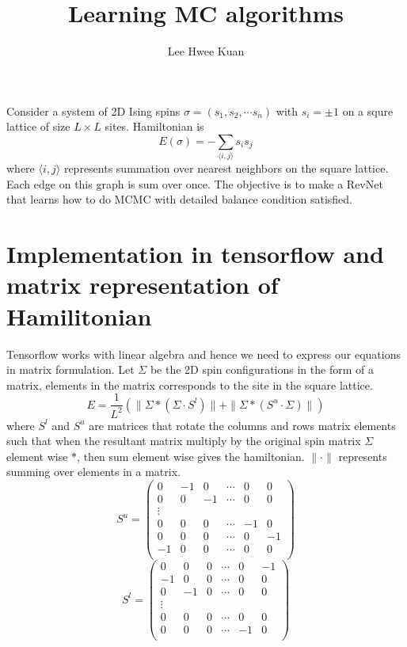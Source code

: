 \documentclass{article}
\title{Learning MC algorithms}
\author{Lee Hwee Kuan}
\begin{document}
\maketitle

Consider a system of 2D Ising spins $\sigma = (s_1,s_2, \cdots s_n)$ with $s_i =\pm 1$
on a squre lattice of size $L \times L$ sites.
Hamiltonian is 
\begin{equation}
E(\sigma) = - \sum_{\langle i,j\rangle} s_i s_j
\end{equation}
where $\langle i,j \rangle$ represents summation over nearest neighbors on 
the square lattice. Each edge on this graph is sum over once.
The objective is to make a RevNet that learns how to do MCMC with detailed balance
condition satisfied.

\section{Implementation in tensorflow and matrix representation of Hamilitonian}

Tensorflow works with linear algebra and hence we need to express our equations
in matrix formulation. Let $\Sigma$ be the 2D spin configurations in the form
of a matrix, elements in the matrix corresponds to the site in the square lattice.
\begin{equation}
E = \frac{1}{L^2} \left(
\|\Sigma * \left( \Sigma \cdot S^l \right)\| +\| \Sigma * \left( S^u \cdot \Sigma \right)\|
\right)
\label{eq:E}
\end{equation}
where $S^l$ and $S^u$ are matrices that rotate the columns and rows matrix elements such that 
when the resultant matrix multiply by the original spin matrix $\Sigma$ element wise $*$, 
then sum element wise gives the hamiltonian. $\|\cdot\|$ represents summing over elements
in a matrix.
\begin{equation}
S^u = \left( \begin{array}{cccccc}
0  &-1 & 0 & \cdots & 0 & 0 \\
0  & 0 &-1 & \cdots & 0 & 0 \\
\vdots & & & & \\
0  & 0 & 0 & \cdots &-1 & 0 \\
0  & 0 & 0 & \cdots & 0 &-1 \\
-1 & 0 & 0 & \cdots & 0 & 0 \\
\end{array} \right)
\end{equation}
\begin{equation}
S^l = \left( \begin{array}{cccccc}
0   & 0 & 0 & \cdots & 0 & -1 \\
-1  & 0 & 0 & \cdots & 0 & 0 \\
0   &-1 & 0 & \cdots & 0 & 0 \\
\vdots & & & & \\
0  & 0 & 0 & \cdots & 0 & 0 \\
0  & 0 & 0 & \cdots &-1 & 0 \\
\end{array} \right)
\end{equation}
\end{document}
